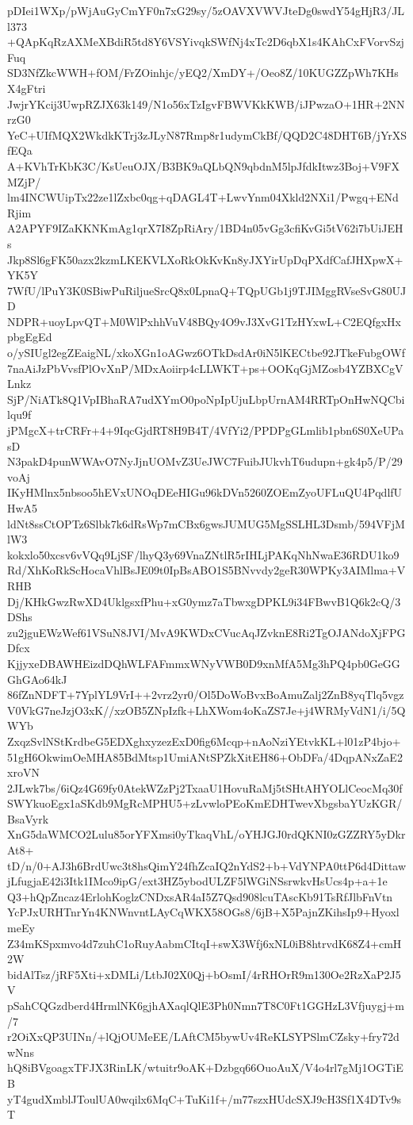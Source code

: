 pDIei1WXp/pWjAuGyCmYF0n7xG29sy/5zOAVXVWVJteDg0swdY54gHjR3/JLl373
+QApKqRzAXMeXBdiR5td8Y6VSYivqkSWfNj4xTc2D6qbX1s4KAhCxFVorvSzjFuq
SD3NfZkcWWH+fOM/FrZOinhjc/yEQ2/XmDY+/Oeo8Z/10KUGZZpWh7KHsX4gFtri
JwjrYKcij3UwpRZJX63k149/N1o56xTzIgvFBWVKkKWB/iJPwzaO+1HR+2NNrzG0
YeC+UIfMQX2WkdkKTrj3zJLyN87Rmp8r1udymCkBf/QQD2C48DHT6B/jYrXSfEQa
A+KVhTrKbK3C/KsUeuOJX/B3BK9aQLbQN9qbdnM5lpJfdkItwz3Boj+V9FXMZjP/
lm4INCWUipTx22ze1lZxbc0qg+qDAGL4T+LwvYnm04Xkld2NXi1/Pwgq+ENdRjim
A2APYF9IZaKKNKmAg1qrX7I8ZpRiAry/1BD4n05vGg3cfiKvGi5tV62i7bUiJEHs
Jkp8Sl6gFK50azx2kzmLKEKVLXoRkOkKvKn8yJXYirUpDqPXdfCafJHXpwX+YK5Y
7WfU/lPuY3K0SBiwPuRiljueSrcQ8x0LpnaQ+TQpUGb1j9TJIMggRVseSvG80UJD
NDPR+uoyLpvQT+M0WlPxhhVuV48BQy4O9vJ3XvG1TzHYxwL+C2EQfgxHxpbgEgEd
o/ySIUgl2egZEaigNL/xkoXGn1oAGwz6OTkDsdAr0iN5lKECtbe92JTkeFubgOWf
7naAiJzPbVvsfPlOvXnP/MDxAoiirp4cLLWKT+ps+OOKqGjMZosb4YZBXCgVLnkz
SjP/NiATk8Q1VpIBhaRA7udXYmO0poNpIpUjuLbpUrnAM4RRTpOnHwNQCbilqu9f
jPMgcX+trCRFr+4+9IqcGjdRT8H9B4T/4VfYi2/PPDPgGLmlib1pbn6S0XeUPasD
N3pakD4punWWAvO7NyJjnUOMvZ3UeJWC7FuibJUkvhT6udupn+gk4p5/P/29voAj
IKyHMlnx5nbsoo5hEVxUNOqDEeHIGu96kDVn5260ZOEmZyoUFLuQU4PqdlfUHwA5
ldNt8ssCtOPTz6Slbk7k6dRsWp7mCBx6gwsJUMUG5MgSSLHL3Dsmb/594VFjMlW3
kokxlo50xcsv6vVQq9LjSF/lhyQ3y69VnaZNtlR5rIHLjPAKqNhNwaE36RDU1ko9
Rd/XhKoRkScHocaVhlBsJE09t0IpBsABO1S5BNvvdy2geR30WPKy3AIMlma+VRHB
Dj/KHkGwzRwXD4UklgsxfPhu+xG0ymz7aTbwxgDPKL9i34FBwvB1Q6k2cQ/3DShs
zu2jguEWzWef61VSuN8JVI/MvA9KWDxCVucAqJZvknE8Ri2TgOJANdoXjFPGDfcx
KjjyxeDBAWHEizdDQhWLFAFmmxWNyVWB0D9xnMfA5Mg3hPQ4pb0GeGGGhGAo64kJ
86fZnNDFT+7YplYL9VrI++2vrz2yr0/Ol5DoWoBvxBoAmuZalj2ZnB8yqTlq5vgz
V0VkG7neJzjO3xK//xzOB5ZNpIzfk+LhXWom4oKaZS7Je+j4WRMyVdN1/i/5QWYb
ZxqzSvlNStKrdbeG5EDXghxyzezExD0fig6Mcqp+nAoNziYEtvkKL+l01zP4bjo+
51gH6OkwimOeMHA85BdMtsp1UmiANtSPZkXitEH86+ObDFa/4DqpANxZaE2xroVN
2JLwk7bs/6iQz4G69fy0AtekWZzPj2TxaaU1HovuRaMj5tSHtAHYOLlCeocMq30f
SWYkuoEgx1aSKdb9MgRcMPHU5+zLvwloPEoKmEDHTwevXbgsbaYUzKGR/BsaVyrk
XnG5daWMCO2Lulu85orYFXmsi0yTkaqVhL/oYHJGJ0rdQKNI0zGZZRY5yDkrAt8+
tD/n/0+AJ3h6BrdUwc3t8hsQimY24fhZcaIQ2nYdS2+b+VdYNPA0ttP6d4Dittaw
jLfugjaE42i3Itk1IMco9ipG/ext3HZ5ybodULZF5lWGiNSsrwkvHsUcs4p+a+1e
Q3+hQpZncaz4ErlohKoglzCNDxsAR4aI5Z7Qsd908lcuTAscKb91TsRfJlbFnVtn
YcPJxURHTnrYn4KNWnvntLAyCqWKX58OGs8/6jB+X5PajnZKihsIp9+HyoxlmeEy
Z34mKSpxmvo4d7zuhC1oRuyAabmCItqI+swX3Wfj6xNL0iB8htrvdK68Z4+cmH2W
bidAlTsz/jRF5Xti+xDMLi/LtbJ02X0Qj+bOsmI/4rRHOrR9m130Oe2RzXaP2J5V
pSahCQGzdberd4HrmlNK6gjhAXaqlQlE3Ph0Nmn7T8C0Ft1GGHzL3Vfjuygj+m/7
r2OiXxQP3UINn/+lQjOUMeEE/LAftCM5bywUv4ReKLSYPSlmCZsky+fry72dwNns
hQ8iBVgoagxTFJX3RinLK/wtuitr9oAK+Dzbgq66OuoAuX/V4o4rl7gMj1OGTiEB
yT4gudXmblJToulUA0wqilx6MqC+TuKi1f+/m77szxHUdcSXJ9cH3Sf1X4DTv9sT
